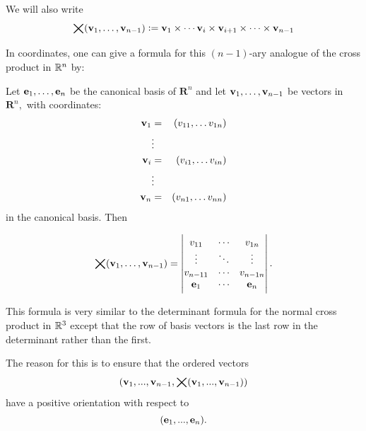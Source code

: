 We will also write 
\[\bigtimes(\mathbf{ v}_1,\dots,\mathbf{ v}_{n-1}):=\mathbf{ v}_1 \times \cdots \mathbf{ v}_i \times \mathbf{ v}_{i+1}  \times \dots \times  \mathbf{ v}_{n-1}  \]




In coordinates, one can give a formula for this
\( (n-1)\)-ary analogue of the cross product in
$\mathbb{R}^n$ by:

\begin{prop} 
Let   $\mathbf{ e}_1,\dots,\mathbf{ e}_{n}$ be the canonical basis of \(\mathbf{R}^n\) and 
let $\mathbf{ v}_1,\dots,\mathbf{ v}_{n-1}$ be vectors in
\(\mathbf{R}^n,\) with coordinates:
\begin{eqnarray*}
 \mathbf{ v}_1&=&(v_{11}, \dots v_{1n})\\
&\vdots&\\
 \mathbf{ v}_i&=&(v_{i1}, \dots v_{in})\\
&\vdots&\\
 \mathbf{ v}_n&=&(v_{n1}, \dots v_{nn})\\
\end{eqnarray*}
in the canonical basis.  Then 

\[\bigtimes(\mathbf{ v}_1,\dots,\mathbf{ v}_{n-1}) =
  \begin{vmatrix}
 v_{11} &\cdots &v_{1n}\\
    \vdots  &\ddots &\vdots\\
    v_{n-1 1} & \cdots &v_{n-1 n}\\
    \mathbf{e}_1 &\cdots &\mathbf{e}_{n}
  \end{vmatrix}.\]  
\end{prop}  

This formula is very similar  to the determinant formula for
the normal cross product in $\mathbb{R}^3$ except that
the row of basis vectors is the last row in the determinant rather than
the first.

The reason for this is to ensure that the ordered vectors
\[(\mathbf{ v}_1, ...,\mathbf{ v}_{n-1},
\bigtimes(\mathbf{ v}_1,
...,\mathbf{ v}_{n-1}))\]
have a positive orientation with respect to
\[(\mathbf{ e}_1, ..., \mathbf{ e}_n).\]

